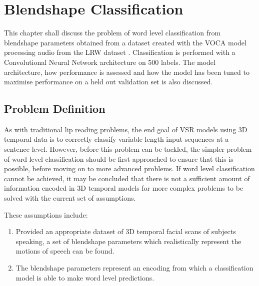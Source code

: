 



\chapter{Blendshape Classification}\label{chap:classification}

This chapter shall discuss the problem of word level classification from blendshape parameters obtained from a dataset created with the VOCA model \cite{Cudeiro2019} processing audio from the LRW dataset \cite{Chung2016}.
Classification is performed with a Convolutional Neural Network architecture on 500 labels.
The model architecture, how performance is assessed and how the model has been tuned to maximise performance on a held out validation set is also discussed. 

\section{Problem Definition}
As with traditional lip reading problems, the end goal of VSR models using 3D temporal data is to correctly classify variable length input sequences at a sentence level.
However, before this problem can be tackled, the simpler problem of word level classification should be first approached to ensure that this is possible, before moving on to more advanced problems.
If word level classification cannot be achieved, it may be concluded that there is not a sufficient amount of information encoded in 3D temporal models for more complex problems to be solved with the current set of assumptions.

These assumptions include:
\begin{enumerate}
    \item Provided an appropriate dataset of 3D temporal facial scans of subjects speaking, a set of blendshape parameters which realistically represent the motions of speech can be found. \label{assumption:class_1}
    \item The blendshape parameters represent an encoding from which a classification model is able to make word level predictions. \label{assumption:class_2}
\end{enumerate}

